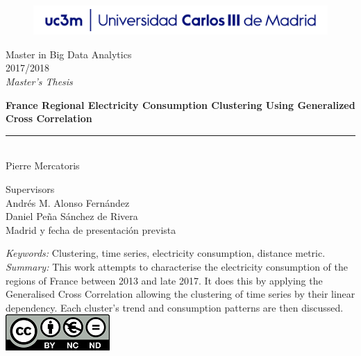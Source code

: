 \begin{titlepage}
\begin{sffamily}
\color{azulUC3M}
\begin{center}
\begin{figure}[htb]
\begin{center}
\vspace*{0.6cm}
\includegraphics[width=15cm]{./latex/imagenes/Portada_Logo.png}
\vspace*{1.6cm}
\end{center}
\end{figure}
\begin{LARGE}
Master in Big Data Analytics \\%
2017/2018 \\%
\vspace*{1cm}
\textsl{Master's Thesis}\\
\end{LARGE}
\Huge{\textbf{France Regional Electricity Consumption Clustering Using Generalized Cross Correlation}} %
\vspace*{1cm}
\rule{80mm}{0.1mm}\\
\huge{Pierre Mercatoris}\\ %
\vspace*{0.5cm}
\begin{Large}
Supervisors\\

Andrés M. Alonso Fernández\\
Daniel Peña Sánchez de Rivera\\
Madrid y fecha de presentación prevista\\
\end{Large}
\end{center}
\vspace*{2cm}
\color{black}
\emph{Keywords:} Clustering, time series, electricity consumption, distance metric. \\
\emph{Summary:} This work attempts to characterise the electricity consumption
of the regions of France between 2013 and late 2017. It does this by applying
the Generalised Cross Correlation allowing the clustering of time series by
their linear dependency. Each cluster's trend and consumption patterns are then discussed.\\
\includegraphics{./latex/imagenes/creativecommons.png}\\


\end{sffamily}
\end{titlepage}
